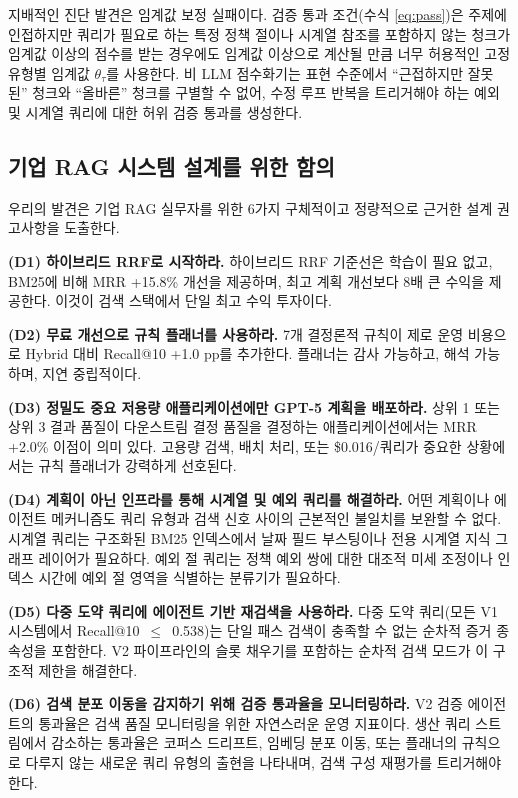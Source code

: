 \documentclass[11pt, a4paper]{article}
\begin{document}
지배적인 진단 발견은 임계값 보정 실패이다. 검증 통과 조건(수식 \ref{eq:pass})은 주제에 인접하지만 쿼리가 필요로 하는 특정 정책 절이나 시계열 참조를 포함하지 않는 청크가 임계값 이상의 점수를 받는 경우에도 임계값 이상으로 계산될 만큼 너무 허용적인 고정 유형별 임계값 $\theta_\tau$를 사용한다. 비 LLM 점수화기는 표현 수준에서 ``근접하지만 잘못된'' 청크와 ``올바른'' 청크를 구별할 수 없어, 수정 루프 반복을 트리거해야 하는 예외 및 시계열 쿼리에 대한 허위 검증 통과를 생성한다.

\subsection{기업 RAG 시스템 설계를 위한 함의}

우리의 발견은 기업 RAG 실무자를 위한 6가지 구체적이고 정량적으로 근거한 설계 권고사항을 도출한다.

\textbf{(D1) 하이브리드 RRF로 시작하라.} 하이브리드 RRF 기준선은 학습이 필요 없고, BM25에 비해 MRR +15.8\% 개선을 제공하며, 최고 계획 개선보다 8배 큰 수익을 제공한다. 이것이 검색 스택에서 단일 최고 수익 투자이다.

\textbf{(D2) 무료 개선으로 규칙 플래너를 사용하라.} 7개 결정론적 규칙이 제로 운영 비용으로 Hybrid 대비 Recall@10 +1.0 pp를 추가한다. 플래너는 감사 가능하고, 해석 가능하며, 지연 중립적이다.

\textbf{(D3) 정밀도 중요 저용량 애플리케이션에만 GPT-5 계획을 배포하라.} 상위 1 또는 상위 3 결과 품질이 다운스트림 결정 품질을 결정하는 애플리케이션에서는 MRR +2.0\% 이점이 의미 있다. 고용량 검색, 배치 처리, 또는 \$0.016/쿼리가 중요한 상황에서는 규칙 플래너가 강력하게 선호된다.

\textbf{(D4) 계획이 아닌 인프라를 통해 시계열 및 예외 쿼리를 해결하라.} 어떤 계획이나 에이전트 메커니즘도 쿼리 유형과 검색 신호 사이의 근본적인 불일치를 보완할 수 없다. 시계열 쿼리는 구조화된 BM25 인덱스에서 날짜 필드 부스팅이나 전용 시계열 지식 그래프 레이어가 필요하다. 예외 절 쿼리는 정책 예외 쌍에 대한 대조적 미세 조정이나 인덱스 시간에 예외 절 영역을 식별하는 분류기가 필요하다.

\textbf{(D5) 다중 도약 쿼리에 에이전트 기반 재검색을 사용하라.} 다중 도약 쿼리(모든 V1 시스템에서 Recall@10~$\leq$~0.538)는 단일 패스 검색이 충족할 수 없는 순차적 증거 종속성을 포함한다. V2 파이프라인의 슬롯 채우기를 포함하는 순차적 검색 모드가 이 구조적 제한을 해결한다.

\textbf{(D6) 검색 분포 이동을 감지하기 위해 검증 통과율을 모니터링하라.} V2 검증 에이전트의 통과율은 검색 품질 모니터링을 위한 자연스러운 운영 지표이다. 생산 쿼리 스트림에서 감소하는 통과율은 코퍼스 드리프트, 임베딩 분포 이동, 또는 플래너의 규칙으로 다루지 않는 새로운 쿼리 유형의 출현을 나타내며, 검색 구성 재평가를 트리거해야 한다.
\end{document}

